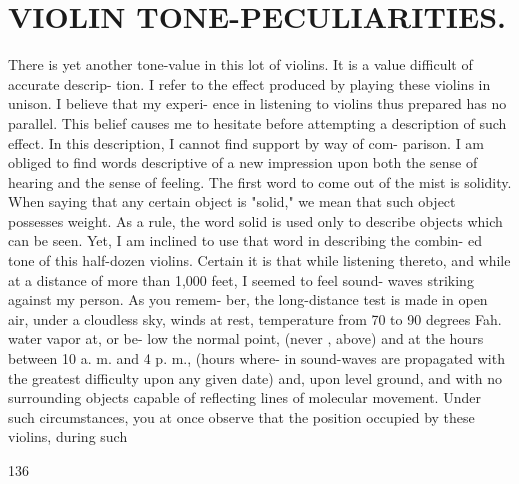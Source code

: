 \documentclass{article}
\begin{document}
\section*{VIOLIN TONE-PECULIARITIES.}
There is yet another tone-value in this lot of violins. It is a value difficult of accurate descrip- tion. I refer to the effect produced by playing these violins in unison. I believe that my experi- ence in listening to violins thus prepared has no parallel. This belief causes me to hesitate before attempting a description of such effect. In this description, I cannot find support by way of com- parison. I am obliged to find words descriptive of a new impression upon both the sense of hearing and the sense of feeling. The first word to come out of the mist is solidity. When saying that any certain object is "solid," we mean that such object possesses weight. As a rule, the word solid is used only to describe objects which can be seen. Yet, I am inclined to use that word in describing the combin- ed tone of this half-dozen violins. Certain it is that while listening thereto, and while at a distance of more than 1,000 feet, I seemed to feel sound- waves striking against my person. As you remem- ber, the long-distance test is made in open air, under a cloudless sky, winds at rest, temperature from 70 to 90 degrees Fah. water vapor at, or be- low the normal point, (never , above) and at the hours between 10 a. m. and 4 p. m., (hours where- in sound-waves are propagated with the greatest difficulty upon any given date) and, upon level ground, and with no surrounding objects capable of reflecting lines of molecular movement. Under such circumstances, you at once observe that the position occupied by these violins, during such

136
\end{document}
